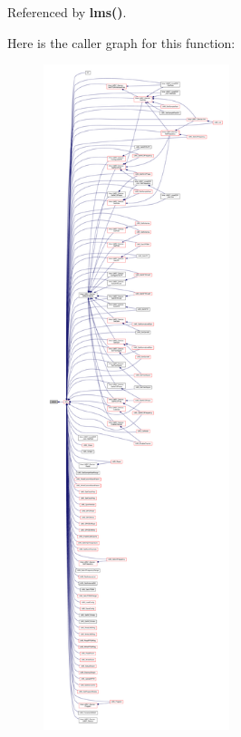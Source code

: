 Referenced by {\bf lms()}.



Here is the caller graph for this function\+:
\nopagebreak
\begin{figure}[H]
\begin{center}
\leavevmode
\includegraphics[height=550pt]{d4/d67/lms_8c_ac81ca32708341eb34b25d515d00bc748_icgraph}
\end{center}
\end{figure}


